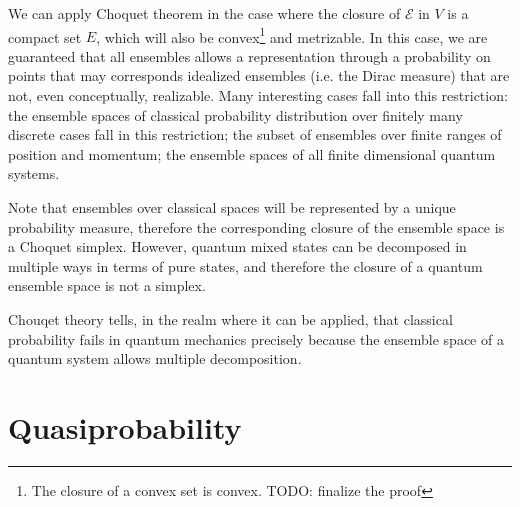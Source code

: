 \documentclass[10pt,twocolumn, nofootinbib]{revtex4-2}
\newcommand{\Ens}[1][E] {\mathcal{#1}} %
\begin{document}
We can apply Choquet theorem in the case where the closure of $\Ens$ in $V$ is a compact set $E$, which will also be convex\footnote{The closure of a convex set is convex. TODO: finalize the proof} and metrizable. In this case, we are guaranteed that all ensembles allows a representation through a probability on points that may corresponds idealized ensembles (i.e. the Dirac measure) that are not, even conceptually, realizable. Many interesting cases fall into this restriction: the ensemble spaces of classical probability distribution over finitely many discrete cases fall in this restriction; the subset of ensembles over finite ranges of position and momentum; the ensemble spaces of all finite dimensional quantum systems.

Note that ensembles over classical spaces will be represented by a unique probability measure, therefore the corresponding closure of the ensemble space is a Choquet simplex. However, quantum mixed states can be decomposed in multiple ways in terms of pure states, and therefore the closure of a quantum ensemble space is not a simplex.


Chouqet theory tells, in the realm where it can be applied, that classical probability fails in quantum mechanics precisely because the ensemble space of a quantum system allows multiple decomposition.

\section{Quasiprobability}



\end{document}
